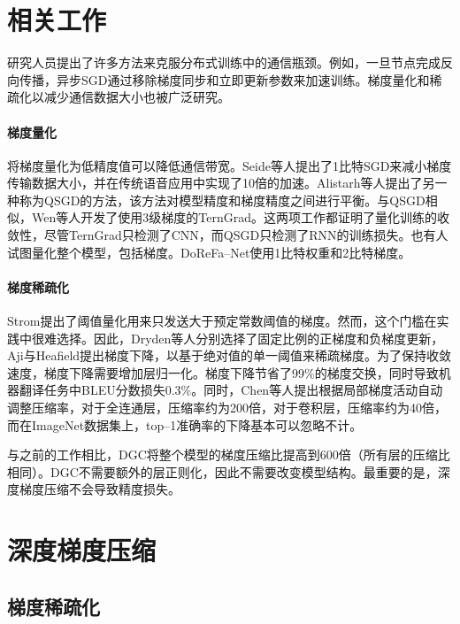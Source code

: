\section{相关工作}
研究人员提出了许多方法来克服分布式训练中的通信瓶颈。例如，一旦节点完成反向传播，异步SGD通过移除梯度同步和立即更新参数来加速训练。梯度量化和稀疏化以减少通信数据大小也被广泛研究。

\paragraph{梯度量化}
将梯度量化为低精度值可以降低通信带宽。Seide等人提出了1比特SGD来减小梯度传输数据大小，并在传统语音应用中实现了10倍的加速。Alistarh等人提出了另一种称为QSGD的方法，该方法对模型精度和梯度精度之间进行平衡。与QSGD相似，Wen等人开发了使用3级梯度的TernGrad。这两项工作都证明了量化训练的收敛性，尽管TernGrad只检测了CNN，而QSGD只检测了RNN的训练损失。也有人试图量化整个模型，包括梯度。DoReFa--Net使用1比特权重和2比特梯度。

\paragraph{梯度稀疏化}
Strom提出了阈值量化用来只发送大于预定常数阈值的梯度。然而，这个门槛在实践中很难选择。因此，Dryden等人分别选择了固定比例的正梯度和负梯度更新，Aji与Heafield提出梯度下降，以基于绝对值的单一阈值来稀疏梯度。为了保持收敛速度，梯度下降需要增加层归一化。梯度下降节省了99\%的梯度交换，同时导致机器翻译任务中BLEU分数损失0.3\%。同时，Chen等人提出根据局部梯度活动自动调整压缩率，对于全连通层，压缩率约为200倍，对于卷积层，压缩率约为40倍，而在ImageNet数据集上，top--1准确率的下降基本可以忽略不计。

与之前的工作相比，DGC将整个模型的梯度压缩比提高到600倍（所有层的压缩比相同）。DGC不需要额外的层正则化，因此不需要改变模型结构。最重要的是，深度梯度压缩不会导致精度损失。

\section{深度梯度压缩}

\subsection{梯度稀疏化}


